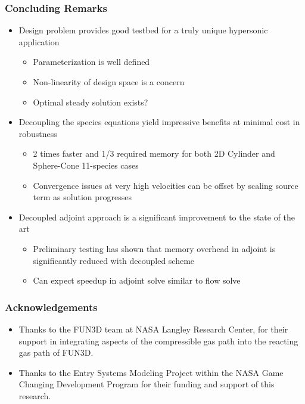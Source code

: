 \documentclass{beamer}
\begin{document}
\begin{frame}
  \frametitle{Concluding Remarks}
  \begin{itemize}
      \item Design problem provides good testbed for a truly unique hypersonic
        application
        \begin{itemize}
          \item Parameterization is well defined
          \item Non-linearity of design space is a concern
          \item Optimal steady solution exists?
        \end{itemize}
    \item Decoupling the species equations yield impressive benefits at minimal cost in robustness
      \begin{itemize}
        \item 2 times faster and 1/3 required memory for both 2D Cylinder and
          Sphere-Cone 11-species cases
        \item Convergence issues at very high velocities can be offset by
          scaling source term as solution progresses
      \end{itemize}
      \item Decoupled adjoint approach is a significant improvement to the
        state of the art
        \begin{itemize}
          \item Preliminary testing has shown that memory overhead in adjoint is
            significantly reduced with decoupled scheme
          \item Can expect speedup in adjoint solve similar to flow solve
        \end{itemize}
  \end{itemize}
\end{frame}
\begin{frame}
  \frametitle{Acknowledgements}
  \begin{itemize}
    \item Thanks to the FUN3D team at NASA Langley Research Center, for their
      support in integrating aspects of the compressible gas path into the
      reacting gas path of FUN3D.
   \item Thanks to the Entry Systems Modeling Project within the NASA
     Game Changing Development Program for their funding and support of this research.  
  \end{itemize}
\end{frame}
\end{document}
